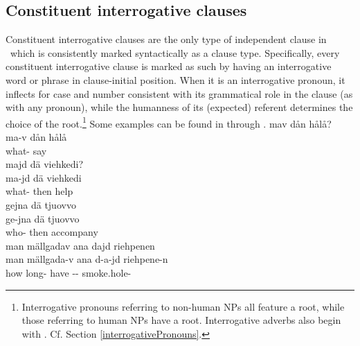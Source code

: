 \subsection{Constituent interrogative clauses}\label{constituentQs}
Constituent interrogative clauses are the only type of independent clause in \PS\ which is consistently marked syntactically as a clause type. Specifically, every constituent interrogative clause is marked as such by having an interrogative word or phrase in clause-initial position. When it is an interrogative pronoun, it inflects for case and number consistent with its grammatical role in the clause (as with any pronoun), while the humanness of its (expected) referent determines the choice of the root.\footnote{Interrogative pronouns referring to non-human NPs all feature a  root, while those referring to human NPs have a  root. Interrogative adverbs also begin with . Cf. Section \ref{interrogativePronouns}.} 
Some examples can be found in  through . 
\ea\label{questionWordQ1}%
\glll	mav dån hålå?\\
	ma-v dån hålå\\
	what-  say\BS{}\\\nopagebreak
{} 
\z
\ea\label{questionWordQ2}%
\glll	majd dä viehkedi?\\
	ma-jd dä viehkedi\\
	what- then help\BS{}\\\nopagebreak
{} 
\z
\ea\label{questionWordQ3}%
\glll	gejna dä tjuovvo\\
	ge-jna dä tjuovvo\\
	who- then accompany\BS{}\\\nopagebreak
{} 
\z
\ea\label{questionWordQ4}%
\glll	man mällgadav ana dajd riehpenen\\
	man mällgada-v ana d-a-jd riehpene-n\\
	how long- have\BS{} -- smoke.hole-\\\nopagebreak
{} 
\z{}

